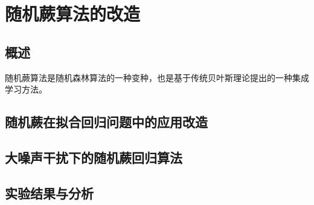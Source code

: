 \chapter{随机蕨算法的改造}

\section{概述} 
随机蕨算法是随机森林算法的一种变种，也是基于传统贝叶斯理论提出的一种集成学习方法。

\section{随机蕨在拟合回归问题中的应用改造}

\section{大噪声干扰下的随机蕨回归算法}

\section{实验结果与分析} %
